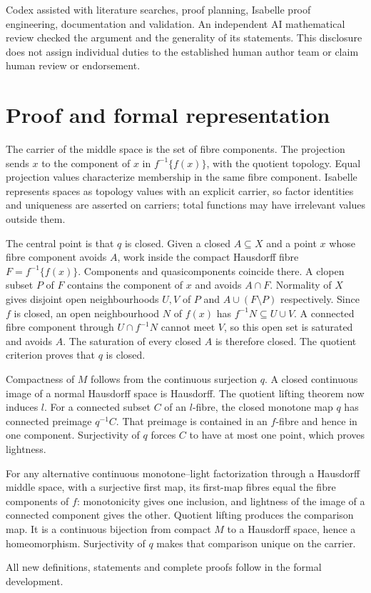 \documentclass[11pt,a4paper]{article}
\begin{document}
Codex assisted with literature searches, proof planning, Isabelle proof
engineering, documentation and validation. An independent AI mathematical
review checked the argument and the generality of its statements. This
disclosure does not assign individual duties to the established human
author team or claim human review or endorsement.

\section{Proof and formal representation}
The carrier of the middle space is the set of fibre components. The
projection sends $x$ to the component of $x$ in $f^{-1}\{f(x)\}$, with the
quotient topology. Equal projection values characterize membership in the
same fibre component. Isabelle represents spaces as topology values with
an explicit carrier, so factor identities and uniqueness are asserted on
carriers; total functions may have irrelevant values outside them.

The central point is that $q$ is closed. Given a closed $A\subseteq X$ and
a point $x$ whose fibre component avoids $A$, work inside the compact
Hausdorff fibre $F=f^{-1}\{f(x)\}$. Components and quasicomponents coincide
there. A clopen subset $P$ of $F$ contains the component of $x$ and avoids
$A\cap F$. Normality of $X$ gives disjoint open neighbourhoods $U,V$ of
$P$ and $A\cup(F\setminus P)$ respectively. Since $f$ is closed, an open
neighbourhood $N$ of $f(x)$ has $f^{-1}N\subseteq U\cup V$. A connected
fibre component through $U\cap f^{-1}N$ cannot meet $V$, so this open set
is saturated and avoids $A$. The saturation of every closed $A$ is
therefore closed. The quotient criterion proves that $q$ is closed.

Compactness of $M$ follows from the continuous surjection $q$.
A closed continuous image of a normal Hausdorff space is Hausdorff.
The quotient lifting theorem now induces $l$. For a connected subset $C$
of an $l$-fibre, the closed monotone map $q$ has connected preimage
$q^{-1}C$. That preimage is contained in an $f$-fibre and hence in one
component. Surjectivity of $q$ forces $C$ to have at most one point,
which proves lightness.

For any alternative continuous monotone--light factorization through a
Hausdorff middle space, with a surjective first map, its first-map fibres equal the fibre components
of $f$: monotonicity gives one inclusion, and lightness of the image
of a connected component gives the other. Quotient lifting produces
the comparison map. It is a continuous bijection from compact $M$
to a Hausdorff space, hence a homeomorphism. Surjectivity of $q$
makes that comparison unique on the carrier.

All new definitions, statements and complete proofs follow in the formal
development.



\end{document}
